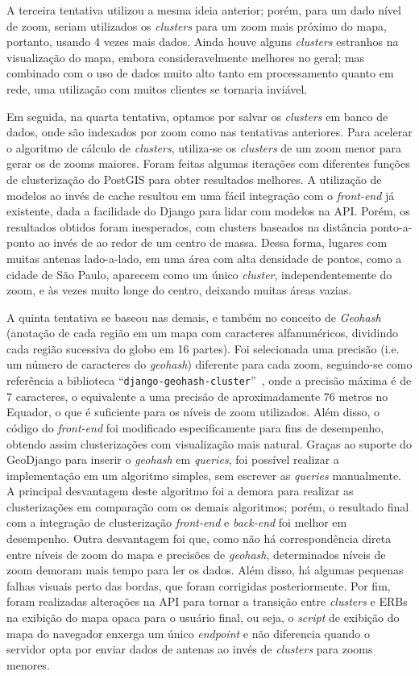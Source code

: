 \documentclass[]{politex}
\begin{document}
A terceira tentativa utilizou a mesma ideia anterior; porém, para um dado nível
de zoom, seriam utilizados os \textit{clusters} para um zoom mais próximo do
mapa, portanto, usando 4 vezes mais dados. Ainda houve alguns \textit{clusters}
estranhos na visualização do mapa, embora consideravelmente melhores no geral;
mas combinado com o uso de dados muito alto tanto em processamento quanto em
rede, uma utilização com muitos clientes se tornaria inviável.

Em seguida, na quarta tentativa, optamos por salvar os \textit{clusters} em
banco de dados, onde são indexados por zoom como nas tentativas anteriores. Para
acelerar o algoritmo de cálculo de \textit{clusters}, utiliza-se os
\textit{clusters} de um zoom menor para gerar os de zooms maiores. Foram feitas
algumas iterações com diferentes funções de clusterização do PostGIS para obter
resultados melhores. A utilização de modelos ao invés de cache resultou em uma
fácil integração com o \textit{front-end} já existente, dada a facilidade do
Django para lidar com modelos na API. Porém, os resultados obtidos foram
inesperados, com clusters baseados na distância ponto-a-ponto ao invés de ao
redor de um centro de massa. Dessa forma, lugares com muitas antenas
lado-a-lado, em uma área com alta densidade de pontos, como a cidade de São
Paulo, aparecem como um único \textit{cluster}, independentemente do zoom, e às
vezes muito longe do centro, deixando muitas áreas vazias.

A quinta tentativa se baseou nas demais, e também no conceito de
\textit{Geohash} (anotação de cada região em um mapa com caracteres
alfanuméricos, dividindo cada região sucessiva do globo em 16 partes). Foi
selecionada uma precisão (i.e. um número de caracteres do \textit{geohash})
diferente para cada zoom, seguindo-se como referência a biblioteca
``\texttt{django-geohash-cluster}''~\cite{geohashcluster}, onde a precisão
máxima é de 7 caracteres, o equivalente a uma precisão de aproximadamente 76
metros no Equador, o que é suficiente para os níveis de zoom utilizados. Além
disso, o código do \textit{front-end} foi modificado especificamente para fins
de desempenho, obtendo assim clusterizações com visualização mais natural.
Graças ao suporte do GeoDjango para inserir o \textit{geohash} em
\textit{queries}, foi possível realizar a implementação em um algoritmo simples,
sem escrever as \textit{queries} manualmente. A principal desvantagem deste
algoritmo foi a demora para realizar as clusterizações em comparação com os
demais algoritmos; porém, o resultado final com a integração de clusterização
\textit{front-end} e \textit{back-end} foi melhor em desempenho. Outra
desvantagem foi que, como não há correspondência direta entre níveis de zoom do
mapa e precisões de \textit{geohash}, determinados níveis de zoom demoram mais
tempo para ler os dados. Além disso, há algumas pequenas falhas visuais perto
das bordas, que foram corrigidas posteriormente. Por fim, foram realizadas
alterações na API para tornar a transição entre \textit{clusters} e ERBs na
exibição do mapa opaca para o usuário final, ou seja, o \textit{script} de
exibição do mapa do navegador enxerga um único \textit{endpoint} e não
diferencia quando o servidor opta por enviar dados de antenas ao invés de
\textit{clusters} para zooms menores.
\end{document}
